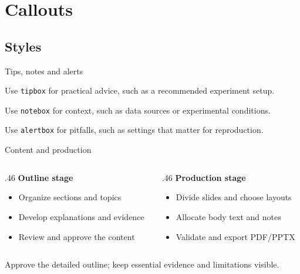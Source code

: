 \section{Callouts}
\subsection{Styles}
\begin{frame}{Tips, notes and alerts}
  \begin{tipbox}[Tip]
    Use \texttt{tipbox} for practical advice, such as a recommended experiment setup.
  \end{tipbox}
  \begin{notebox}[Note]
    Use \texttt{notebox} for context, such as data sources or experimental conditions.
  \end{notebox}
  \begin{alertbox}[Alert]
    Use \texttt{alertbox} for pitfalls, such as settings that matter for reproduction.
  \end{alertbox}
\end{frame}

\begin{frame}{Content and production}
  \begin{columns}[T,onlytextwidth]
    \begin{column}{.46\textwidth}
      \textbf{Outline stage}
      \begin{itemize}
        \item Organize sections and topics
        \item Develop explanations and evidence
        \item Review and approve the content
      \end{itemize}
    \end{column}
    \begin{column}{.46\textwidth}
      \textbf{Production stage}
      \begin{itemize}
        \item Divide slides and choose layouts
        \item Allocate body text and notes
        \item Validate and export PDF/PPTX
      \end{itemize}
    \end{column}
  \end{columns}
  \begin{notebox}
    Approve the detailed outline; keep essential evidence and limitations visible.
  \end{notebox}
\end{frame}

